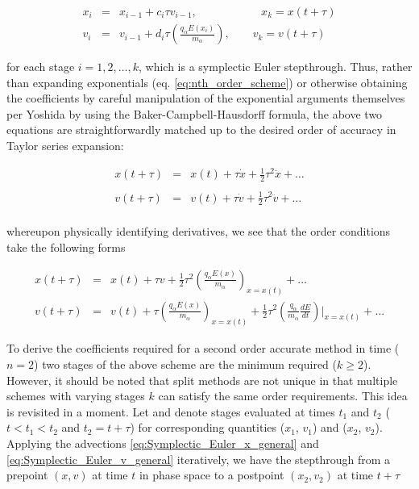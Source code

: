 \documentclass[11pt,titlepage]{report}
\begin{document}
\begin{eqnarray}
x_i & = & x_{i-1} + c_i \tau v_{i-1} , \qquad\qquad\quad\,\,\,\,  x_k = x(t + \tau) \label{eq:Symplectic_Euler_x_general}\\[0.3em]
v_i & = & v_{i-1} + d_i\tau \left(\frac{q_{\alpha}E(x_i)}{m_{\alpha}}\right), \qquad v_k = v(t + \tau ) \label{eq:Symplectic_Euler_v_general}
\end{eqnarray}

\noindent for each stage $i = 1,2,\ldots , k$, which is a symplectic Euler stepthrough. Thus, rather than expanding exponentials (eq. \eqref{eq:nth_order_scheme}) or otherwise obtaining the coefficients by careful manipulation of the exponential arguments themselves per Yoshida \cite{Yoshida90} by using the Baker-Campbell-Hausdorff formula, the above two equations are straightforwardly matched up to the desired order of accuracy in Taylor series expansion:

\begin{eqnarray*}
x(t + \tau ) & = & x(t) + \tau \dot{x} + \frac{1}{2}\tau^2 \ddot{x} + \ldots \\
&&\\
v(t + \tau ) & = & v(t) + \tau \dot{v} + \frac{1}{2}\tau^2 \ddot{v} + \ldots \\
\end{eqnarray*}

\noindent whereupon physically identifying derivatives, we see that the order conditions take the following forms

\begin{eqnarray}
x(t + \tau ) & = & x(t) + \tau v + \frac{1}{2}\tau^2 \left(\frac{q_{\alpha}E(x)}{m_{\alpha}}\right)_{x = x(t)} + \ldots \label{eq:Taylor_order_conditions_x}\\[1.5em]
v(t + \tau ) & = & v(t) + \tau  \left(\frac{q_{\alpha}E(x)}{m_{\alpha}}\right)_{x = x(t)} + \frac{1}{2}\tau^2 \left(\frac{q_{\alpha}}{m_{\alpha}}\frac{dE}{dt}\right)\biggr|_{x = x(t)} + \ldots \label{eq:Taylor_order_conditions_v}
\end{eqnarray}

To derive the coefficients required for a second order accurate method in time ($n = 2$) two stages of the above scheme are the minimum required ($k \geq 2$). However, it should be noted that split methods are not unique in that multiple schemes with varying stages $k$ can satisfy the same order requirements. This idea is revisited in a moment. Let  and  denote stages evaluated at times $t_1$ and $t_2$ ($t < t_1 < t_2$ and $t_2 = t + \tau $) for corresponding quantities ($x_1$, $v_1$) and ($x_2$, $v_2$). Applying the advections \eqref{eq:Symplectic_Euler_x_general} and \eqref{eq:Symplectic_Euler_v_general} iteratively, we have the stepthrough from a prepoint $(x,v)$ at time $t$ in phase space to a postpoint $(x_2,v_2)$ at time $t + \tau$
\end{document}
